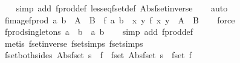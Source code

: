 \begin{isabellebody}
%
\isadelimproof
\ \ %
\endisadelimproof
%
\isatagproof
{}\isamarkupfalse%
\ {\isacharparenleft}simp\ add{\isacharcolon}\ fprod{\isacharunderscore}def\ less{\isacharunderscore}eq{\isacharunderscore}fset{\isacharunderscore}def\ Abs{\isacharunderscore}fset{\isacharunderscore}inverse{\isacharparenright}\isanewline
\ \ \isamarkupfalse%
\ auto%
\endisatagproof
{\isafoldproof}%
%
\isadelimproof
\isanewline
%
\endisadelimproof
\isanewline
{}\isamarkupfalse%
\ fimage{\isacharunderscore}fprod{\isacharcolon}\ {\isachardoublequoteopen}{\isacharparenleft}a{\isacharcomma}\ b{\isacharparenright}\ {\isacharbar}{\isasymin}{\isacharbar}\ A\ {\isacharbar}{\isasymtimes}{\isacharbar}\ B\ {\isasymLongrightarrow}\ f\ a\ b\ {\isacharbar}{\isasymin}{\isacharbar}\ {\isacharparenleft}{\isasymlambda}{\isacharparenleft}x{\isacharcomma}\ y{\isacharparenright}{\isachardot}\ f\ x\ y{\isacharparenright}\ {\isacharbar}{\isacharbackquote}{\isacharbar}\ {\isacharparenleft}A\ {\isacharbar}{\isasymtimes}{\isacharbar}\ B{\isacharparenright}{\isachardoublequoteclose}\isanewline
%
\isadelimproof
\ \ %
\endisadelimproof
%
\isatagproof
{}\isamarkupfalse%
\ force%
\endisatagproof
{\isafoldproof}%
%
\isadelimproof
\isanewline
%
\endisadelimproof
\isanewline
{}\isamarkupfalse%
\ fprod{\isacharunderscore}singletons{\isacharcolon}\ {\isachardoublequoteopen}{\isacharbraceleft}{\isacharbar}a{\isacharbar}{\isacharbraceright}\ {\isacharbar}{\isasymtimes}{\isacharbar}\ {\isacharbraceleft}{\isacharbar}b{\isacharbar}{\isacharbraceright}\ {\isacharequal}\ {\isacharbraceleft}{\isacharbar}{\isacharparenleft}a{\isacharcomma}\ b{\isacharparenright}{\isacharbar}{\isacharbraceright}{\isachardoublequoteclose}\isanewline
%
\isadelimproof
\ \ %
\endisadelimproof
%
\isatagproof
{}\isamarkupfalse%
\ {\isacharparenleft}simp\ add{\isacharcolon}\ fprod{\isacharunderscore}def{\isacharparenright}\isanewline
\ \ \isamarkupfalse%
\ {\isacharparenleft}metis\ fset{\isacharunderscore}inverse\ fset{\isacharunderscore}simps{\isacharparenleft}{}{\isacharparenright}\ fset{\isacharunderscore}simps{\isacharparenleft}{}{\isacharparenright}{\isacharparenright}%
\endisatagproof
{\isafoldproof}%
%
\isadelimproof
\isanewline
%
\endisadelimproof
\isanewline
{}\isamarkupfalse%
\ fset{\isacharunderscore}both{\isacharunderscore}sides{\isacharcolon}\ {\isachardoublequoteopen}{\isacharparenleft}Abs{\isacharunderscore}fset\ s\ {\isacharequal}\ f{\isacharparenright}\ {\isacharequal}\ {\isacharparenleft}fset\ {\isacharparenleft}Abs{\isacharunderscore}fset\ s{\isacharparenright}\ {\isacharequal}\ fset\ f{\isacharparenright}{\isachardoublequoteclose}\isanewline

\end{isabellebody}
